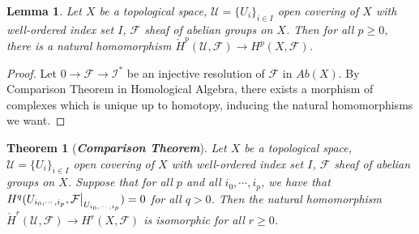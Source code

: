 \documentclass{ctexart}
\newtheorem{theorem}{Theorem}[section]
\newtheorem{lemma}{Lemma}[section]
\begin{document}
\begin{lemma}
    Let $X$ be a topological space, $\mathcal{U} = \{U_{i}\}_{i\in I}$ open covering of $X$ with well-ordered index set $I$, $\mathcal{F}$ sheaf of abelian groups on $X$.
    Then for all $p \ge 0$, there is a natural homomorphism $\check{H}^{p}(\mathcal{U}, \mathcal{F}) \longrightarrow H^{p}(X, \mathcal{F})$.
    \label{Lemma 2.6}
\end{lemma}
\begin{proof}
    Let $0 \longrightarrow \mathcal{F} \longrightarrow \mathcal{I}^{\ast}$ be an injective resolution of $\mathcal{F}$ in $Ab(X)$. 
    By Comparison Theorem in Homological Algebra, there exists a morphism of complexes which is unique up to homotopy,
    inducing the natural homomorphisms we want.
\end{proof}
\begin{theorem}[\textbf{\emph{Comparison Theorem}}]
    Let $X$ be a topological space, $\mathcal{U} = \{U_{i}\}_{i\in I}$ open covering of $X$ with well-ordered index set $I$, $\mathcal{F}$ sheaf of abelian groups on $X$.
    Suppose that for all $p$ and all $i_{0}, \cdots, i_{p}$, we have that $H^{q}(U_{i_{0}, \cdots, i_{p}}, \mathcal{F}\big{|}_{U_{i_{0}, \cdots, i_{p}}}) = 0$ for all $q > 0$.
    Then the natural homomorphism $\check{H}^{r}(\mathcal{U}, \mathcal{F}) \longrightarrow H^{r}(X, \mathcal{F})$ is isomorphic for all $r \ge 0$.
    \label{Theorem 2.5}
\end{theorem}
\end{document}
